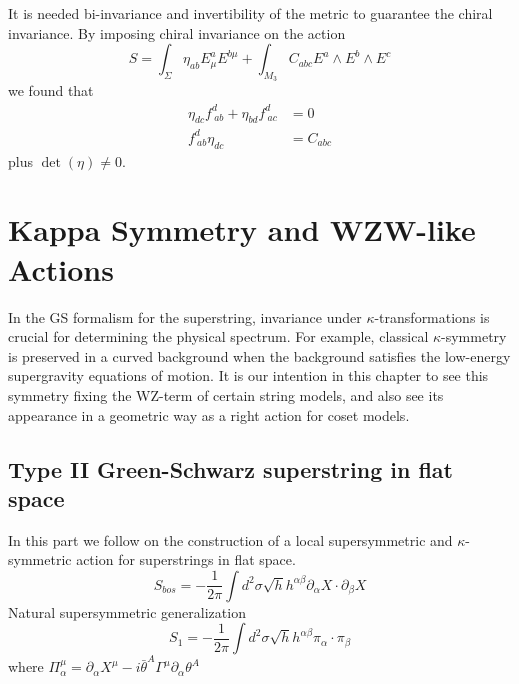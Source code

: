\documentclass[a4paper,12pt]{article}
\numberwithin{equation}{section}
\numberwithin{thm}{section}
\numberwithin{exm}{section}
\newcommand{\p}{\partial}
\newcommand{\we}{{\wedge}}
\newcommand{\<}{{\langle}}
\renewcommand{\>}{{\rangle}}
\renewcommand{\a}{{\alpha}}
\renewcommand{\b}{{\beta}}
\newcommand{\G}{{\Gamma}}
\renewcommand{\k}{{\kappa}}
\newcommand{\m}{{\mu}}
\newcommand{\s}{{\sigma}}
\renewcommand{\S}{{\Sigma}}
\renewcommand{\t}{{\theta}}
\newcommand{\tb}{{\bar\theta}}
\begin{document}
It is needed bi-invariance and invertibility of the metric to guarantee the chiral invariance. By imposing chiral invariance on the action
	\begin{equation}
	S = \int_\S \eta_{ab} E^a_\m E^{b\m} + \int_{M_3} C_{abc}E^a\we E^b\we E^c
	\end{equation}
we found that
	\begin{align}
	\eta_{dc}f^d_{\ ab} + \eta_{bd} f^d_{\ ac} & = 0 \\
	f^d_{\ ab}\eta_{dc} & = C_{abc}
	\end{align}
plus $\det(\eta)\neq 0$.



\section{Kappa Symmetry and WZW-like Actions}
In the GS formalism for the superstring, invariance under $\k$-transformations is crucial for determining the physical spectrum. For example, classical $\k$-symmetry is preserved in a curved background when the background satisfies the low-energy supergravity equations of motion. It is our intention in this chapter to see this symmetry fixing the WZ-term of certain string models, and also see its appearance in a geometric way as a right action for coset models.


\subsection{Type II Green-Schwarz superstring in flat space}
In this part we follow \cite{Green1987} on the construction of a local supersymmetric and $\k$-symmetric action for superstrings in flat space.
	\begin{equation}
	S_{bos} = -\frac{1}{2\pi} \int d^2\s \sqrt{h} h^{\a\b}\p_\a X \cdot \p_\b X
	\end{equation}
Natural supersymmetric generalization
	\begin{equation}
	S_1 = -\frac{1}{2\pi} \int d^2\s \sqrt{h} h^{\a\b} \pi_\a \cdot \pi_\b
	\end{equation}
where $\Pi^\m_\a = \p_\a X^\m - i \tb^A\G^\m\p_\a\t^A$
\end{document}
